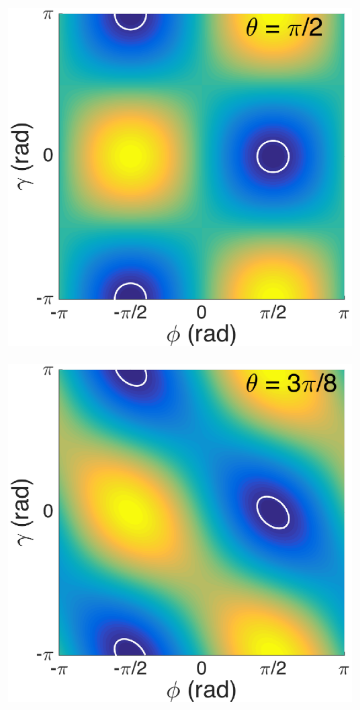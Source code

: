 \documentclass[aps,prl,superscriptaddress]{revtex4-1}
\begin{document}
\begin{figure}
\begin{subfigure}[t]{0.45\columnwidth}
    	\caption{\label{theoryb}}
    \end{subfigure}
    \begin{subfigure}[t]{0.32\columnwidth}
    	\includegraphics[width=\textwidth]{figs/Figure5a.eps}
    	\caption{\label{phasea}}
    \end{subfigure}
    \begin{subfigure}[t]{0.32\columnwidth}
    	\includegraphics[width=\textwidth]{figs/Figure5b.eps}

\end{subfigure}
\end{figure}
\end{document}
